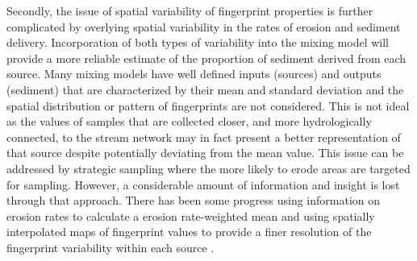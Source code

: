 \documentclass[
  number]{elsarticle}
\begin{document}
Secondly, the issue of spatial variability of fingerprint properties is
further complicated by overlying spatial variability in the rates of
erosion and sediment delivery. Incorporation of both types of
variability into the mixing model will provide a more reliable estimate
of the proportion of sediment derived from each source. Many mixing
models have well defined inputs (sources) and outputs (sediment) that
are characterized by their mean and standard deviation and the spatial
distribution or pattern of fingerprints are not considered. This is not
ideal as the values of samples that are collected closer, and more
hydrologically connected, to the stream network may in fact present a
better representation of that source despite potentially deviating from
the mean value. This issue can be addressed by strategic sampling where
the more likely to erode areas are targeted for sampling. However, a
considerable amount of information and insight is lost through that
approach. There has been some progress using information on erosion
rates to calculate a erosion rate-weighted mean
\citep{wilkinson2015, du2017} and using spatially interpolated maps of
fingerprint values to provide a finer resolution of the fingerprint
variability within each source \citep{haddadchi2019}.
\end{document}
